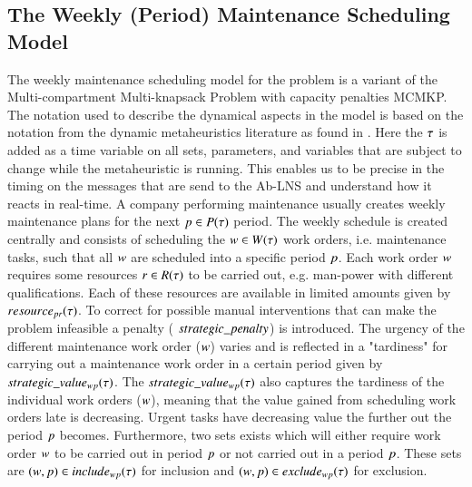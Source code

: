 \subsection{The Weekly (Period) Maintenance Scheduling Model}
The weekly maintenance scheduling model for the problem
is a variant of the  Multi-compartment Multi-knapsack Problem with capacity penalties MCMKP.
The notation used to describe the dynamical aspects in the model is based on the notation
from the dynamic metaheuristics literature as found in \cite{yangMetaheuristicsDynamicCombinatorial2013}.
Here the $\tau$ is added as a time variable on all sets, parameters, and variables that are
subject to change while the metaheuristic is running. This enables us to be precise in the timing on
the messages that are send to the Ab-LNS and understand how it reacts in real-time.
A company performing maintenance usually creates weekly maintenance plans for
the next $p \in P(\tau)$ period. The weekly schedule is created
centrally and consists of scheduling the $\ElementWorkOrder \in \SetWorkOrder$
work orders, i.e. maintenance tasks, such that all $w$
are scheduled into a specific period $p$. Each work order $
w$ requires some resources $r \in R(\tau)$
to be carried out, e.g. man-power with different qualifications. Each of these
resources are available in limited amounts given by $\ParStrategicResource$. To correct
for possible manual interventions that can make the problem infeasible a penalty (
$strategic\_penalty$) is introduced. The urgency of the different maintenance work order ($w$)
varies and is reflected in a "tardiness" for carrying out a maintenance work
order in a certain period given by $strategic\_value_{w p}(\tau)$. The $strategic\_value_{w p}(\tau)$ also
captures the tardiness of the individual work orders ($w$), meaning that
the value gained from scheduling work orders late is decreasing. Urgent tasks have
decreasing value the further out the period $p$ becomes.
Furthermore, two sets exists which will either require work order $w$ to be carried
out in period $p$ or not carried out in a period $p$.
These sets are $(w,p) \in
include_{wp}(\tau)$ for inclusion and  $(w, p) \in
exclude_{wp}(\tau)$ for exclusion.


\strategicmodel[clustering=true, beta=false]

